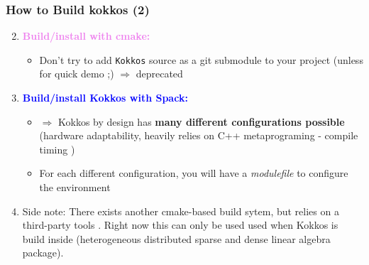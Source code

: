 \begin{frame}
   \frametitle{How to Build kokkos (2)}

   \begin{enumerate}
      \setcounter{enumi}{1}
   \item \textcolor{violet}{\bf Build/install with cmake:} \\
      \begin{itemize}
      \item Don't try to add {\tt Kokkos} source as a git submodule to your project (unless for quick demo ;) $\Rightarrow$ deprecated
      \end{itemize}
   \item \textcolor{blue}{\textbf{Build/install Kokkos with Spack:}}
      \begin{itemize}
      \item $\Rightarrow$ Kokkos by design has {\bf many different configurations possible} (hardware adaptability, heavily relies on C++ metaprograming - compile timing )
      \item For each different configuration, you will have a \textit{modulefile} to configure the environment
      \end{itemize}
   \item Side note: There exists another cmake-based build sytem, but relies on a third-party tools . Right now this can only be used used when Kokkos is build inside  (heterogeneous distributed sparse and dense linear algebra package).
  \end{enumerate}

\end{frame}

